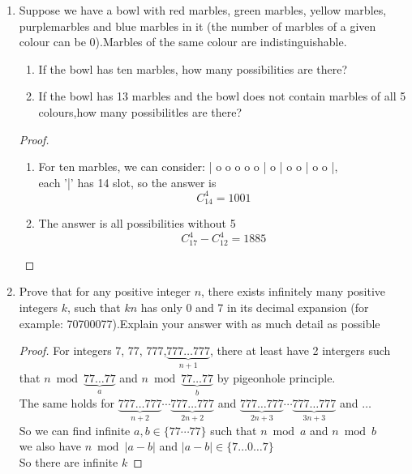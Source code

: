 \documentclass{article}
\theoremstyle{break}
\begin{document}
\begin{enumerate}
        \item Suppose  we  have  a  bowl  with  red  marbles,  green  marbles,  yellow  marbles,  purplemarbles and blue marbles in it (the number of marbles of a given colour can be 0).Marbles of the same colour are indistinguishable.
        \begin{enumerate}
                \item If the bowl has ten marbles, how many possibilities are there?
                \item If the bowl has 13 marbles and the bowl does not contain marbles of all 5 colours,how many possibilitles are there?
        \end{enumerate}
        \begin{proof}
                \begin{enumerate}
                        \item For ten marbles, we can consider:
                        | o o o o o | o | o o | o o |, \\
                        each '|' has 14 slot, so the answer is
                        $$ C_{14}^4 = 1001 $$
                        \item The answer is all possibilities without 5 
                        $$  C_{17}^4 - C_{12}^4 = 1885    $$
                \end{enumerate}
        \end{proof}
        \vspace{10mm}
        \item Prove  that  for  any  positive  integer $n$,  there  exists  infinitely  many  positive  integers $k$, such that $kn$ has only 0 and 7 in its decimal expansion (for example:  70700077).Explain your answer with as much detail as possible
        \begin{proof}
                For integers 7, 77, 777,$\underbrace{777 \dots 777}_{n+1}$, there at least have 2 intergers such that $n \bmod \underbrace{77 \dots 77}_{a} $ and $n \bmod \underbrace{77 \dots 77}_{b}$ by pigeonhole principle.\\
                The same holds for $\underbrace{777 \dots 777}_{n+2} \cdots \underbrace{777 \dots 777}_{2n+2}$ and $\underbrace{777 \dots 777}_{2n+3} \cdots \underbrace{777 \dots 777}_{3n+3}$ and $\dots$\\
                So we can find infinite $a,b \in \{ 77 \cdots 77 \}$ such that $n \bmod a$  and $n \bmod b$ \\
                we also have $n \bmod |a-b|$ and $|a-b| \in \{ 7 \dots 0 \dots 7\}$\\
                So there are infinite $k$ 
        \end{proof}
\end{enumerate}
\end{document}
